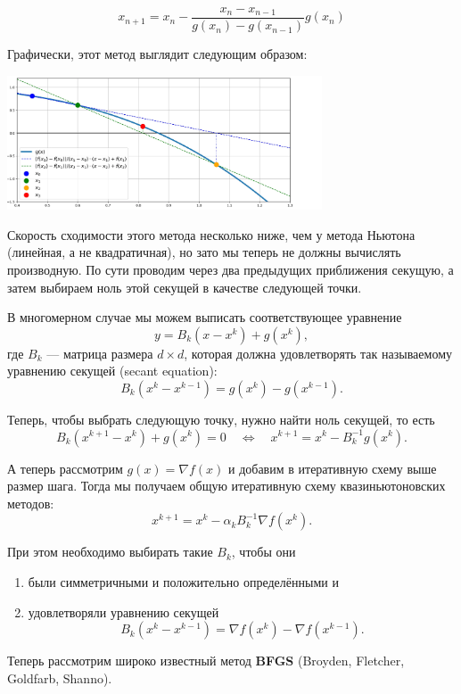 \[x_{n+1} = x_n - \frac{x_n - x_{n-1}}{g(x_n) - g(x_{n-1})}g(x_n)\]


Графически, этот метод выглядит следующим образом:

\begin{center}
    \includegraphics[width=0.7\textwidth]{chapters/general/secant_method.png}
\end{center}

Скорость сходимости этого метода несколько ниже, чем у метода Ньютона (линейная, а не квадратичная), но зато мы теперь не должны вычислять производную. По сути проводим через два предыдущих приближения секущую, а затем выбираем ноль этой секущей в качестве следующей точки.

В многомерном случае мы можем выписать соответствующее уравнение
\[
    y = B_k \left( x - x^k \right) + g(x^k),
\]
где \( B_k \) — матрица размера \( d \times d \), которая должна удовлетворять так называемому уравнению секущей (secant equation):
\[
    B_k \left( x^k - x^{k-1} \right) = g(x^k) - g(x^{k-1}).
\]

Теперь, чтобы выбрать следующую точку, нужно найти ноль секущей, то есть
\[
    B_k \left( x^{k+1} - x^k \right) + g(x^k) = 0
    \quad \Longleftrightarrow \quad
    x^{k+1} = x^k - B_k^{-1} g(x^k).
\]

А теперь рассмотрим \( g(x) = \nabla f(x) \) и добавим в итеративную схему выше размер шага. Тогда мы получаем общую итеративную схему квазиньютоновских методов:
\[
    x^{k+1} = x^k - \alpha_k B_k^{-1} \nabla f(x^k).
\]

При этом необходимо выбирать такие \( B_k \), чтобы они
\begin{enumerate}
    \item были симметричными и положительно определёнными и
    \item удовлетворяли уравнению секущей
          \[
              B_k \left( x^k - x^{k-1} \right) = \nabla f(x^k) - \nabla f(x^{k-1}).
          \]
\end{enumerate}

Теперь рассмотрим широко известный метод \textbf{BFGS} (Broyden, Fletcher, Goldfarb, Shanno).



